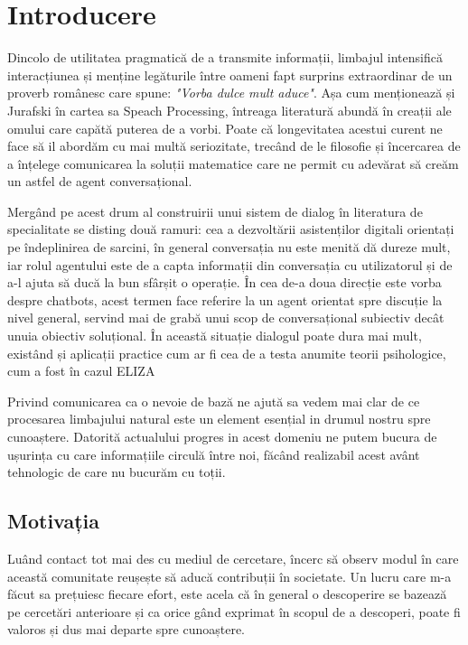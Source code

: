 \chapter{Introducere}

Dincolo de utilitatea pragmatică de a transmite informații, limbajul intensifică interacțiunea și menține legăturile între oameni fapt surprins extraordinar de un proverb românesc care spune: \textit{"Vorba dulce mult aduce"}. Așa cum menționează și Jurafski în cartea sa Speach Processing, întreaga literatură abundă în creații ale omului care capătă puterea de a vorbi. Poate că longevitatea acestui curent ne face să il abordăm cu mai multă seriozitate, trecând de le filosofie și încercarea de a înțelege comunicarea la soluții matematice care ne permit cu adevărat să creăm un astfel de agent conversațional.

Mergând pe acest drum al construirii unui sistem de dialog în literatura de specialitate se disting două ramuri: cea a dezvoltării asistenților digitali orientați pe îndeplinirea de sarcini, în general conversația nu este menită dă dureze mult, iar rolul agentului este de a capta informații din conversația cu utilizatorul și de a-l ajuta să ducă la bun sfârșit o operație. În cea de-a doua direcție este vorba despre chatbots, acest termen face referire la un agent orientat spre discuție la nivel general, servind mai de grabă unui scop de conversațional subiectiv decât unuia obiectiv soluțional. În această situație dialogul poate dura mai mult, existând și aplicații practice cum ar fi cea de a testa anumite teorii psihologice, cum a fost în cazul ELIZA \cite{weizenbaum}

Privind comunicarea ca o nevoie de bază ne ajută sa vedem mai clar de ce procesarea limbajului natural este un element esențial in drumul nostru spre cunoaștere. Datorită actualului progres in acest domeniu ne putem bucura de ușurința cu care informațiile circulă între noi, făcând realizabil acest avânt tehnologic de care nu bucurăm cu toții.


\section{Motivația}

Luând contact tot mai des cu mediul de cercetare, încerc să observ modul în care această comunitate reușește să aducă contribuții în societate. Un lucru care m-a făcut sa prețuiesc fiecare efort, este acela că în general o descoperire se bazează pe cercetări anterioare și ca orice gând exprimat în scopul de a descoperi, poate fi valoros și dus mai departe spre cunoaștere.

